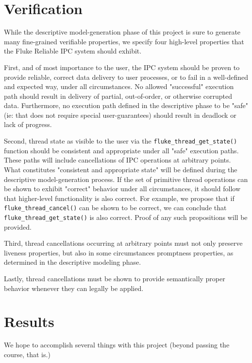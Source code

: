 \documentclass{article}
\begin{document}
\section*{Verification}

While the descriptive model-generation phase of this project is sure
to generate many fine-grained verifiable properties, we 
specify four high-level properties that the Fluke Reliable
IPC system should exhibit.

First, and of most importance to the user, the IPC system should
be proven to provide reliable, correct data delivery to user processes,
or to fail in a well-defined and expected way, under all circumstances.
No allowed "successful" execution path should result in delivery of
partial, out-of-order, or otherwise corrupted data.  Furthermore,
no execution path defined in the descriptive phase to be "safe" (ie:
that does not require special user-guarantees) should result in
deadlock or lack of progress.

Second, thread state as visible to the user via the {\tt fluke_thread_get_state()}
function should be consistent and appropriate under all "safe" execution
paths.  These paths will include cancellations of IPC operations at
arbitrary points.  What constitutes "consistent and appropriate state"
will be defined during the descriptive model-generation process.
If the set of primitive thread operations can be
shown to exhibit "correct" behavior under all circumstances, it 
should follow that higher-level functionality is also correct.  
For example, we propose that if {\tt fluke_thread_cancel()} can be shown
to be correct, we can conclude that {\tt fluke_thread_get_state()}
is also correct.
Proof of any such propositions will be provided.

Third, thread cancellations occurring at arbitrary points must
not only preserve liveness properties, but also in some circumstances
promptness properties, as determined in the descriptive modeling
phase.

Lastly, thread cancellations must be shown to provide semantically
proper behavior whenever they can legally be applied.

\section*{Results}

We hope to accomplish several things with this project (beyond passing
the course, that is.)
\end{document}
